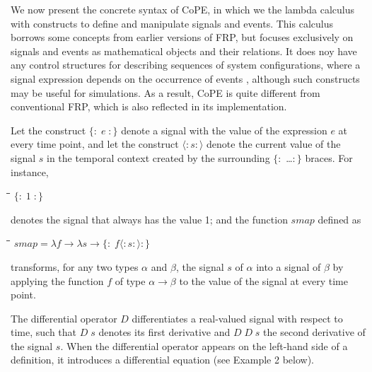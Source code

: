 \documentclass[11pt]{article}
\newlength{\lwidth}\setlength{\lwidth}{4.5cm}
\newlength{\cwidth}\setlength{\cwidth}{8mm} %
\newcommand{\Conid}[1]{\mathit{#1}}
\newcommand{\Varid}[1]{\mathit{#1}}
\begin{document}
We now present the concrete syntax of CoPE, in which we the lambda
calculus with constructs to define and manipulate signals and
events. 
% 
% 
%
This calculus borrows some concepts from earlier versions of FRP, but
focuses exclusively on signals and events as mathematical objects and
their relations.  It does noy have any control structures for
describing sequences of system configurations, where a signal
expression depends on the occurrence of events \citep{Elliott1997,
  Nilsson2002}, although such constructs may be useful for
simulations. As a result, CoPE is quite different from conventional
FRP, which is also reflected in its implementation.

Let the construct \ensuremath{\{\!:\!\;\Varid{e}\;\!:\!\}} denote a signal with the value of
the expression \ensuremath{\Varid{e}} at every time point, and let the construct \ensuremath{\langle:\Varid{s}:\rangle} denote the current value of the signal \ensuremath{\Varid{s}} in the temporal context
created by the surrounding \ensuremath{\{\!:\!} \ldots \ensuremath{\!:\!\}} braces. For
instance,
\begin{tabbing}
\qquad\=\hspace{\lwidth}\=\hspace{\cwidth}\=\+\kill
${\{\!:\!\;\mathrm{1}\;\!:\!\}}$
\end{tabbing}denotes the signal that always has the value 1; and the function \ensuremath{\Varid{smap}}
defined as
\begin{tabbing}
\qquad\=\hspace{\lwidth}\=\hspace{\cwidth}\=\+\kill
${\Varid{smap}\mathrel{=}\lambda \Varid{f}\to \lambda \Varid{s}\to \{\!:\!\;\Varid{f}\langle:\Varid{s}:\rangle\!:\!\}}$
\end{tabbing}transforms, for any two types \ensuremath{\alpha} and \ensuremath{\beta}, the signal \ensuremath{\Varid{s}} of \ensuremath{\alpha}
into a signal of \ensuremath{\beta} by applying the function \ensuremath{\Varid{f}} of type \ensuremath{\alpha\to \beta} to the value of the signal at every time point.

The differential operator \ensuremath{\Conid{D}} differentiates a real-valued signal with
respect to time, such that \ensuremath{\Conid{D}\;\Varid{s}} denotes its first derivative and \ensuremath{\Conid{D}\;\Conid{D}\;\Varid{s}} the second derivative of the signal \ensuremath{\Varid{s}}. When the differential
operator appears on the left-hand side of a definition, it
introduces a differential equation (see Example 2 below).
\end{document}
